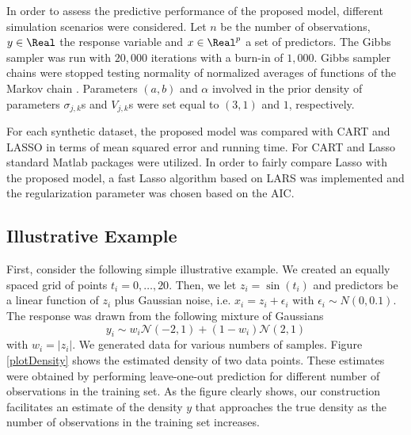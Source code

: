 In order to assess the predictive performance of the proposed model, different simulation scenarios were considered. Let $n$ be the number of observations, $y \in \Real$ the response variable and $x \in \Real^p$ a set of predictors. The Gibbs sampler was run with $20,000$  iterations with a burn-in of $1,000$. Gibbs sampler chains were stopped testing normality of normalized averages of functions of the Markov chain \cite{Chauveau98anautomated}. Parameters $(a,b)$ and $\alpha$ involved in the prior density of parameters $\sigma_{j,k}$s and $V_{j,k}$s were set equal to $(3,1)$ and $1$, respectively.

For each synthetic dataset, the proposed model was compared with CART and LASSO in terms of mean squared error and running time. For CART and Lasso standard Matlab packages were utilized. In order to fairly compare Lasso with the proposed model, a fast Lasso algorithm based on LARS was implemented and the regularization parameter was chosen based on  the AIC. 

\subsection{Illustrative Example}
First, consider the following simple illustrative example.
We created an equally spaced grid of points $t_i=0, \ldots, 20$. Then, we let $z_i=\sin(t_i)$ and predictors be a linear function of $z_i$ plus Gaussian noise, i.e. $x_i=z_i + \epsilon_i$ with $\epsilon_i \sim N(0,0.1)$. The response was drawn from the following mixture of Gaussians
\begin{equation}
y_i \sim w_i \mathcal{N}(-2,1) + (1-w_i) \mathcal{N}(2,1) 
\end{equation}
with $w_i=|z_i|$. We generated data for various numbers of samples. Figure \ref{plotDensity} shows the estimated density of two data points. These estimates were obtained by performing leave-one-out prediction for different number of observations in the training set. As the figure clearly shows, our construction facilitates an estimate of the density $y$ that approaches the true density as the number of observations in the training set increases.



